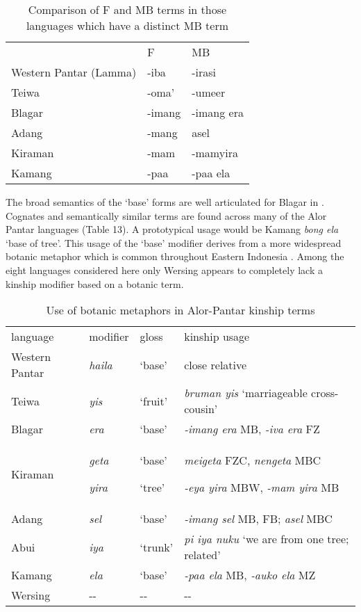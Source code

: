 \begin{table}
\begin{tabular}{lll} & F\par & MB\par\\
Western Pantar (Lamma) & {}-iba & {}-irasi\\
Teiwa & {}-oma' & {}-umeer\\
Blagar & {}-imang & {}-imang era\\
Adang & {}-mang & asel\\
Kiraman & {}-mam & {}-mamyira\\
Kamang & {}-paa & {}-paa ela\\
\end{tabular}

\caption{Comparison of F and MB terms in those languages which have a distinct MB term}
\end{table}

The broad semantics of the `base' forms are well articulated for Blagar in \citet[156]{Steinhauer1993}. Cognates and semantically similar terms are found across many of the Alor Pantar languages (Table 13). A prototypical usage would be Kamang \textit{bong ela} `base of tree'. This usage of the `base' modifier derives from a more widespread botanic metaphor which is common throughout Eastern Indonesia \citep{Fox1995}. Among the eight languages considered here only Wersing appears to completely lack a kinship modifier based on a botanic term.


\begin{table}
\begin{tabular}{llll}
language & modifier & gloss & kinship usage\\
Western Pantar & \textit{haila} & `base' & close relative\\
Teiwa & \textit{yis} & `fruit' & \textit{bruman yis} `marriageable cross-cousin'\\
Blagar & \textit{era} & `base' & \textit{{}-imang era} MB, \textit{{}-iva era} FZ\\
Kiraman & \textit{geta}

\textit{yira} & `base'

`tree' & \textit{meigeta} FZC, \textit{nengeta} MBC

\textit{{}-eya yira} MBW, \textit{{}-mam yira} MB\\
Adang & \textit{sel} & `base' & \textit{{}-imang sel} MB, FB; \textit{asel} MBC\\
Abui & \textit{iya} & `trunk' & \textit{pi iya nuku} `we are from one tree; related'\\
Kamang & \textit{ela} & `base' & \textit{{}-paa ela} MB, \textit{{}-auko ela} MZ\\
Wersing & {}-{}- & {}-{}- & {}-{}-\\
\end{tabular}

\caption{Use of botanic metaphors in Alor-Pantar kinship terms }
\end{table}

